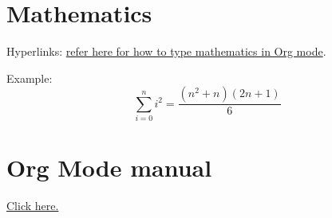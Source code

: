 \documentclass[11pt]{article}
\begin{document}
\section{Mathematics}
\label{sec:org4e98726}

Hyperlinks: \href{https://math.meta.stackexchange.com/questions/5020/mathjax-basic-tutorial-and-quick-reference}{refer here for how to type mathematics in Org mode}.

Example:
$$\sum_{i=0}^n i^2 = \frac{(n^2+n)(2n+1)}{6}$$

\section{Org Mode manual}
\label{sec:org747ebaf}
\href{https://orgmode.org/manual/}{Click here.}
\end{document}

